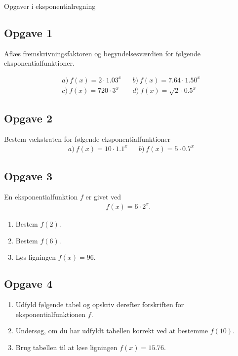 \begin{center}
\Huge
Opgaver i eksponentialregning
\end{center}

\subsection*{Opgave 1}

Aflæs fremskrivningsfaktoren og begyndelsesværdien for følgende eksponentialfunktioner.

\begin{align*}
	&a) \   f(x) = 2\cdot 1.03^x   &&b) \   f(x) = 7.64 \cdot 1.50^x \\
	&c) \   f(x) = 720 \cdot 3^x  &&d) \   f(x) = \sqrt{2} \cdot 0.5^x
\end{align*}


\subsection*{Opgave 2}

Bestem vækstraten for følgende eksponentialfunktioner
\begin{align*}
	&a) \ f(x) = 10\cdot 1.1^x  &&b) \ f(x) = 5\cdot  0.7^x
\end{align*}


\subsection*{Opgave 3}
En eksponentialfunktion $f$ er givet ved
\begin{align*}
	f(x) = 6 \cdot 2^x.
\end{align*}

\begin{enumerate}[label=\roman*)]
	\item Bestem $f(2)$.
	\item Bestem $f(6)$.
	\item Løs ligningen $f(x) = 96$.
\end{enumerate}

\subsection*{Opgave 4}

\begin{enumerate}[label=\roman*)]
	\item Udfyld følgende tabel og opskriv derefter forskriften for eksponentialfunktionen $f$.
	\item Undersøg, om du har udfyldt tabellen korrekt ved at bestemme $f(10)$. 
	\item Brug tabellen til at løse ligningen $f(x) = 15.76$.
\end{enumerate}

